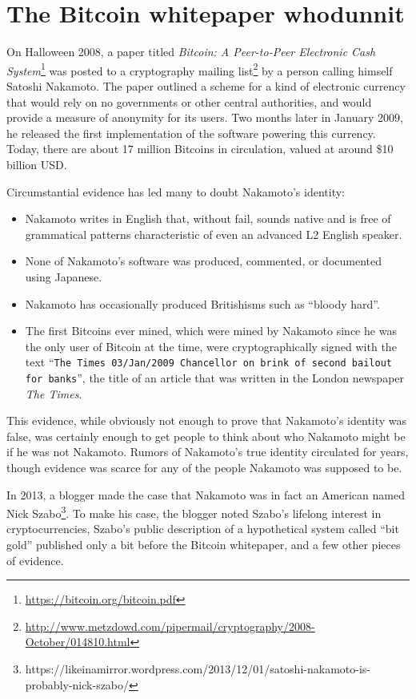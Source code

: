 \documentclass{article}
\let\oldsection\section
\renewcommand\section{\clearpage\oldsection}
\begin{document}
\section{The Bitcoin whitepaper whodunnit}

On Halloween 2008, a paper titled \emph{Bitcoin: A Peer-to-Peer Electronic Cash System}\footnote{\url{https://bitcoin.org/bitcoin.pdf}} was posted to a cryptography mailing list\footnote{\url{http://www.metzdowd.com/pipermail/cryptography/2008-October/014810.html}} by a person calling himself Satoshi Nakamoto. The paper outlined a scheme for a kind of electronic currency that would rely on no governments or other central authorities, and would provide a measure of anonymity for its users. Two months later in January 2009, he released the first implementation of the software powering this currency. Today, there are about 17 million Bitcoins in circulation, valued at around \$10 billion USD.

Circumstantial evidence has led many to doubt Nakamoto's identity:

\begin{itemize}
    \item Nakamoto writes in English that, without fail, sounds native and is free of grammatical patterns characteristic of even an advanced L2 English speaker.
    \item None of Nakamoto's software was produced, commented, or documented using Japanese.
    \item Nakamoto has occasionally produced Britishisms such as ``bloody hard''.
    \item The first Bitcoins ever mined, which were mined by Nakamoto since he was the only user of Bitcoin at the time, were cryptographically signed with the text ``{\tt The Times 03/Jan/2009 Chancellor on brink of second bailout for banks}'', the title of an article that was written in the London newspaper \emph{The Times}.
\end{itemize}

\noindent This evidence, while obviously not enough to prove that Nakamoto's identity was false, was certainly enough to get people to think about who Nakamoto might be if he was not Nakamoto. Rumors of Nakamoto's true identity circulated for years, though evidence was scarce for any of the people Nakamoto was supposed to be.

In 2013, a blogger made the case that Nakamoto was in fact an American named Nick Szabo\footnote{https://likeinamirror.wordpress.com/2013/12/01/satoshi-nakamoto-is-probably-nick-szabo/}. To make his case, the blogger noted Szabo's lifelong interest in cryptocurrencies, Szabo's public description of a hypothetical system called ``bit gold'' published only a bit before the Bitcoin whitepaper, and a few other pieces of evidence. 
\end{document}
